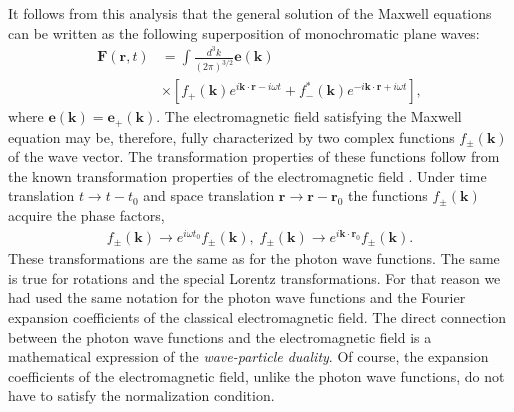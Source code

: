 \documentclass[twocolumn,aps,pra,10pt]{revtex4-1}
\begin{document}
It follows from this analysis that the general solution of the Maxwell equations can be written as the following superposition of monochromatic plane waves:
\begin{align}\label{fin}
{\bm F}(\bm r,t)&=\int\!\frac{d^3k}{(2\pi)^{3/2}}{\bm e}(\bm k)\nonumber\\
&\times\left[f_+(\bm k)e^{i\bm k\cdot\bm r-i\omega t}+f_-^*(\bm k)e^{-i\bm k\cdot\bm r+i\omega t}\right],
\end{align}
where ${\bm e}({\bm k})={\bm e}_+({\bm k})$. The electromagnetic field satisfying the Maxwell equation may be, therefore, fully characterized by two complex functions $f_\pm({\bm k})$ of the wave vector. The transformation properties of these functions follow from the known transformation properties of the electromagnetic field \cite{jack}. Under time translation $t\to t-t_0$ and space translation $\bm r\to \bm r-\bm r_0$ the functions $f_\pm({\bm k})$ acquire the phase factors,
\begin{align}\label{trans}
f_\pm(\bm k)\to e^{i\omega t_0}f_\pm(\bm k),\;f_\pm(\bm k)\to e^{i{\bm k}\cdot{\bm r}_0}f_\pm(\bm k).
\end{align}
These transformations are the same as for the photon wave functions. The same is true for rotations and the special Lorentz transformations. For that reason we had used the same notation for the photon wave functions and the Fourier expansion coefficients of the classical electromagnetic field. The direct connection between the photon wave functions and the electromagnetic field is a mathematical expression of the {\em wave-particle duality}. Of course, the expansion coefficients of the electromagnetic field, unlike the photon wave functions, do not have to satisfy the normalization condition.
\end{document}
